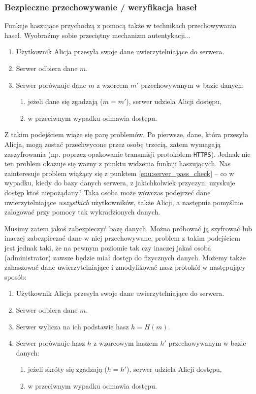 \documentclass[12pt,a4paper,twoside]{article}
\begin{document}
\subsubsection{Bezpieczne przechowywanie / weryfikacja haseł}
\label{sec:usage_password_check}
Funkcje haszujące przychodzą z pomocą także w technikach przechowywania haseł.
Wyobraźmy sobie przeciętny mechanizm autentykacji...

\begin{enumerate}
\item Użytkownik Alicja przesyła swoje dane uwierzytelniające do serwera.
\item Serwer odbiera dane $m$.
\item Serwer porównuje dane $m$ z wzorcem $m'$ przechowywanym w bazie danych:
\label{enu:server_pass_check}
    \begin{enumerate}[label*=\arabic*.]
    \item jeżeli dane się zgadzają ($m = m'$), serwer udziela Alicji dostępu,
    \item w przeciwnym wypadku odmawia dostępu.
    \end{enumerate}
\end{enumerate}

Z takim podejściem wiąże się parę problemów. Po pierwsze, dane, która przesyła
Alicja, mogą zostać przechwycone przez osobę trzecią, zatem wymagają
zaszyfrowania (np. poprzez opakowanie transmisji protokołem \texttt{HTTPS}).
Jednak nie ten problem okazuje się ważny z punktu widzenia funkcji haszujących.
Nas zainteresuje problem wiążący się z punktem \ref{enu:server_pass_check} --
co w wypadku, kiedy do bazy danych serwera, z jakichkolwiek przyczyn, uzyskuje
dostęp ktoś niepożądany? Taka osoba może wówczas podejrzeć dane
uwierzytelniające \emph{wszystkich} użytkowników, także Alicji, a następnie
pomyślnie zalogować przy pomocy tak wykradzionych danych.

Musimy zatem jakoś zabezpieczyć bazę danych. Można próbować ją szyfrować lub
inaczej zabezpieczać dane w niej przechowywane, problem z takim podejściem jest
jednak taki, że na pewnym poziomie tak czy inaczej jakaś osoba (administrator)
zawsze będzie miał dostęp do fizycznych danych. Możemy także zahaszować dane
uwierzytelniające i zmodyfikować nasz protokół w następujący sposób:

\begin{enumerate}
\item Użytkownik Alicja przesyła swoje dane uwierzytelniające do serwera.
\item Serwer odbiera dane $m$.
\item Serwer wylicza na ich podstawie hasz $h = H(m)$.
\item Serwer porównuje hasz $h$ z wzorcowym haszem $h'$ przechowywanym w bazie
danych:
    \begin{enumerate}[label*=\arabic*.]
    \item jeżeli skróty się zgadzają ($h = h'$), serwer udziela Alicji dostępu,
    \item w przeciwnym wypadku odmawia dostępu.
    \end{enumerate}
\end{enumerate}
\end{document}
